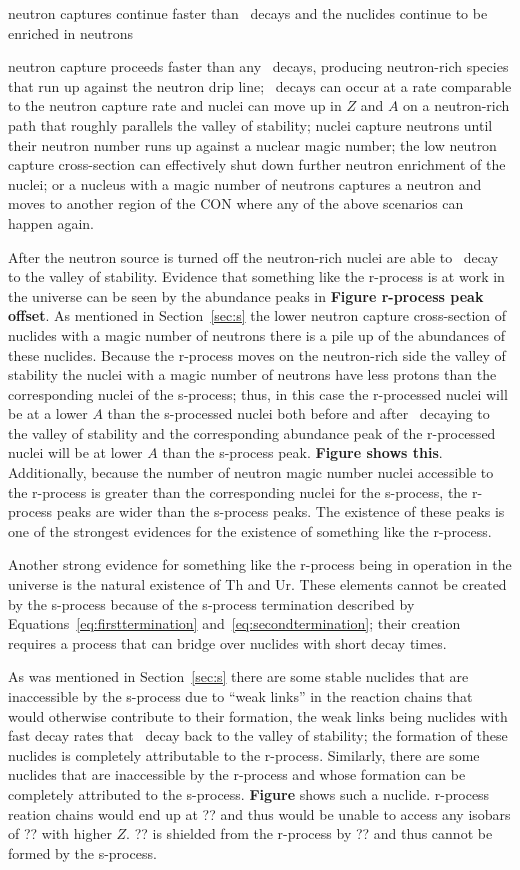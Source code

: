 neutron captures continue faster than \bminus\ decays and the
nuclides continue to be enriched in neutrons

 neutron capture proceeds
faster than any \bminus\ decays, producing neutron-rich species that
run up against the neutron drip line; \bminus\ decays can occur at a
rate comparable to the neutron capture rate and nuclei can move up in
$Z$ and $A$ on a neutron-rich path that roughly parallels the valley 
of stability; nuclei capture neutrons until their neutron number 
runs up against a nuclear magic number; the low neutron capture
cross-section can effectively shut down further neutron enrichment of
the nuclei; or a nucleus with a magic number of neutrons captures a
neutron and moves to another region of the CON where any of the above
scenarios can happen again.

After the neutron source is turned off the neutron-rich nuclei are
able to \bminus\ decay to the valley of stability.  Evidence that
something like the r-process is at work in the universe can be seen by
the abundance peaks in {\bf Figure r-process peak offset}.  As
mentioned in Section~\ref{sec:s} 
the lower neutron capture cross-section of nuclides with a magic
number of neutrons there is a pile up of the abundances of these
nuclides.   Because the r-process moves on the neutron-rich side
the valley of stability the nuclei with a magic number of neutrons
have less protons than the corresponding nuclei of the s-process;
thus, in this case the r-processed nuclei will be at a lower $A$ than the
s-processed nuclei both before and after \bminus\ decaying to the
valley of stability and the corresponding abundance peak of the
r-processed nuclei will be at lower $A$ than the s-process peak.  {\bf
Figure shows this}.  Additionally, because the number of neutron magic
number nuclei accessible to the r-process is greater than the
corresponding nuclei for the s-process, the r-process peaks are wider
than the s-process peaks.  The existence of these peaks is one of the
strongest evidences for the existence of something like the r-process.

Another strong evidence for something like the r-process being in
operation in the universe is the natural existence of Th and Ur.
These elements cannot be created by the s-process because of the
s-process termination described by Equations~\ref{eq:firsttermination}
and~\ref{eq:secondtermination}; their creation requires a process that
can bridge over nuclides with short decay times.

As was mentioned in Section~\ref{sec:s} there are some stable nuclides
that are inaccessible by the s-process due to ``weak links'' in the
reaction chains that would otherwise contribute to their formation,
the weak links being nuclides with fast decay rates that \bminus\
decay back to the valley of stability; the formation of these nuclides
is completely attributable to the r-process.  Similarly, there are
some nuclides that are inaccessible by the r-process and whose
formation can be completely attributed to the s-process.  {\bf Figure}
shows such a nuclide.  r-process reation chains would end up at ?? and
thus would be unable to access any isobars of ?? with higher $Z$.  ??
is shielded from the r-process by ?? and thus cannot be formed by the
s-process.

